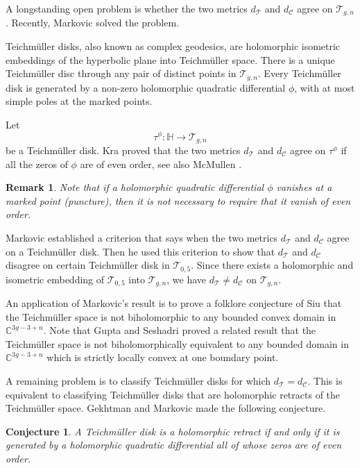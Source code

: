 \documentclass[11pt]{amsart}
\theoremstyle{plain}
\newtheorem{conj}[Theorem]{Conjecture}
\newtheorem{Remark}{Remark}
\newcommand{\Tei}{\mathcal{T}}
\newcommand{\C}{\mathbb{C}}
\begin{document}
A longstanding open  problem is whether the two metrics $d_\Tei$ and $d_\mathcal{C}$ agree on $\Tei_{g,n}$. Recently, Markovic \cite{Markovic2018} solved the problem. 

Teichm\"uller disks, also known as complex geodesics, are holomorphic isometric
 embeddings of the hyperbolic plane into Teichm\"uller space. There is a unique Teichm\"uller disc through any pair of distinct points in $\Tei_{g,n}$. Every Teichm\"uller disk is generated by a non-zero holomorphic quadratic differential $\phi$, with at most simple poles at the marked points.  

Let $$\tau^\phi: \mathbb{H} \rightarrow \Tei_{g,n}$$ 
be a Teichm\"uller disk. 
Kra \cite{Kra1981} proved that the two metrics $d_\Tei$ and $d_\mathcal{C}$ agree on $\tau^\phi$ if all the zeros of $\phi$ are of even order, 
see also McMullen \cite[Theorem 4.1]{McMullen2003}. 
\begin{Remark}
 Note that if a holomorphic quadratic differential $\phi$ vanishes at a marked point (puncture), then it is not necessary to require that it vanish of even order.
\end{Remark}

Markovic \cite{Markovic2018} established a criterion that says when the two metrics $d_\Tei$ and $d_\mathcal{C}$ agree on a Teichm\"uller disk. 
Then he used this criterion to show that  $d_\Tei$ and $d_\mathcal{C}$ disagree on certain Teichm\"uller disk in $\Tei_{0,5}$.
Since there exists a holomorphic and isometric embedding of $\Tei_{0,5}$  into $\Tei_{g,n}$, 
we have  $d_\Tei\neq d_\mathcal{C}$ on $\Tei_{g,n}$.

  An application of Markovic's result is to prove a folklore conjecture of Siu that the Teichm\"uller space is not biholomorphic to any bounded convex domain in $\C^{3g-3+n}$.  Note that Gupta and Seshadri 
 \cite[Theorem 1.1.]{GS2020} proved a related result that the Teichm\"uller space is not biholomorphically equivalent to any bounded domain in $\C^{3g-3+n}$ which is strictly locally convex at one boundary point. 

\medskip
 
A remaining problem is to classify Teichm\"{u}ller disks for which $d_\Tei = d_\mathcal{C}$.
This is equivalent  to classifying Teichm\"{u}ller disks that are holomorphic retracts of the Teichm\"uller space. Gekhtman and Markovic   \cite{GM2020} made the following conjecture.

\begin{conj}\label{conj:equl}
A Teichm\"uller disk  is a holomorphic retract if and only if it is generated by
a holomorphic quadratic differential all of whose zeros are of even order.
\end{conj}
\end{document}
